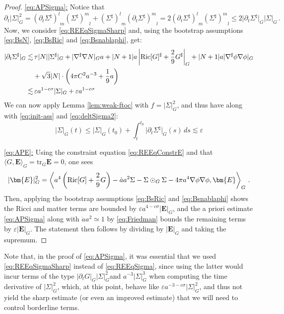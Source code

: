 \documentclass[11pt,leqno,textwidth=10cm]{amsart}
\numberwithin{equation}{section}
\theoremstyle{definition}
\theoremstyle{plain}
\newcommand{\1}{\mathbbm{1}}
\newcommand{\Ric}{\text{\normalfont{Ric}}}
\renewcommand{\epsilon}{\varepsilon}
\newcommand{\del}{\partial}
\newcommand{\RE}{\bm{E}}
\newcommand{\change}[1]{\color{black}#1\color{black}}
\begin{document}
\begin{proof}
\underline{\eqref{eq:APSigma}:} Notice that
\begin{equation}\label{eq:deltSigma2}
\del_t\lvert\Sigma\rvert_G^2={(\del_t\Sigma^\sharp)^l}_m{(\Sigma^\sharp)^m}_l+{(\Sigma^\sharp)^l}_m{(\del_t\Sigma^\sharp)^m}_l=2{(\del_t\Sigma^\sharp)^l}_m{(\Sigma^\sharp)^m}_l\leq 2\lvert\del_t\Sigma^\sharp\rvert_G\lvert\Sigma\rvert_G\,.
\end{equation}
Now, we consider \eqref{eq:REEqSigmaSharp} and, using the bootstrap assumptions \eqref{eq:BsN}, \eqref{eq:BsRic} and \eqref{eq:Bsnablaphi}, get:
\begin{align*}
\lvert\del_t\Sigma^\sharp\rvert_G\lesssim&\,\tau\lvert N\rvert\lvert\Sigma^\sharp\rvert_G+\lvert\nabla^\sharp\nabla N\rvert_G a+\lvert N+1\rvert a\left\lvert\Ric[G]^\sharp+\frac29G^\sharp\right\rvert_G+\lvert N+1\rvert a\lvert\nabla^\sharp\phi\nabla\phi\rvert_G\\
&+\sqrt{3}\lvert N\rvert\cdot\left(4\pi C^2a^{-3}+\frac19a\right)\\
\lesssim&\,{\epsilon} a^{1-c\sigma}\lvert\Sigma\rvert_G+{\epsilon}a^{1-c\sigma}
\end{align*}
We can now apply Lemma \ref{lem:weak-ftoc} with $f=\lvert\Sigma\rvert_G^2$, and thus have along with \eqref{eq:init-ass} and \eqref{eq:deltSigma2}:
\[\lvert\Sigma\rvert_G(t)\leq\lvert\Sigma\rvert_G(t_0)+\int_t^{t_0}\lvert\del_t\Sigma^\sharp\rvert_G(s)\,ds\lesssim\epsilon\]

\underline{\eqref{eq:APE}:} Using the constraint equation \eqref{eq:REEqConstrE} and that $\langle G,\RE\rangle_G=\text{tr}_G\RE=0$, one sees
\begin{equation*}
\lvert\RE\rvert_G^2=\left\langle a^4\left(\Ric[G]+\frac29G\right)-\dot{a}a^2\Sigma-\Sigma\odot_G\Sigma-4\pi a^4\nabla\phi\nabla\phi,\RE\right\rangle_G\,.
\end{equation*}
Then, applying the bootstrap assumptions \eqref{eq:BsRic} and \eqref{eq:Bsnablaphi} shows the Ricci and matter terms are bounded by $\epsilon a^{4-c\sigma}\lvert\RE\rvert_G$, and the a priori estimate \eqref{eq:APSigma} along with $\dot{a}a^2\simeq 1$ by \eqref{eq:Friedman} bounds the remaining terms by $\epsilon\lvert\RE\rvert_G$. The statement then follows by dividing by $\lvert\RE\rvert_G$ and taking the supremum.
\end{proof}
\change{Note that, in the proof of \eqref{eq:APSigma}, it was essential that we used
\eqref{eq:REEqSigmaSharp} instead of \eqref{eq:REEqSigma}, since using the latter would incur terms of the type $\lvert\del_tG\rvert_G\lvert\Sigma\rvert_G^2$and $a^{-3}\lvert \Sigma\rvert_G^3$ when computing the time derivative of $\lvert\Sigma\rvert_G^2$, which, at this point, behave like $\epsilon a^{-3-c\sigma}\lvert \Sigma\rvert_G^2$, and thus not yield the sharp estimate (or even an improved estimate) that we will need to control borderline terms.}
\end{document}
